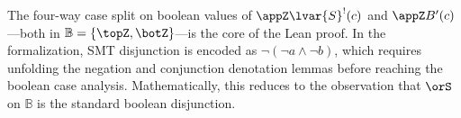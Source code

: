 \begin{note}
  The four-way case split on boolean values of $\appZ \lvar{S}^!(c)$ and $\appZ B'(c)$---both in $\mathbb{B} = \{\topZ, \botZ\}$---is the core of the Lean proof.
  In the formalization, SMT disjunction is encoded as $\lnot(\lnot a \land \lnot b)$, which requires unfolding the negation and conjunction denotation lemmas before reaching the boolean case analysis.
  Mathematically, this reduces to the observation that $\orS$ on $\mathbb{B}$ is the standard boolean disjunction.
\end{note}
